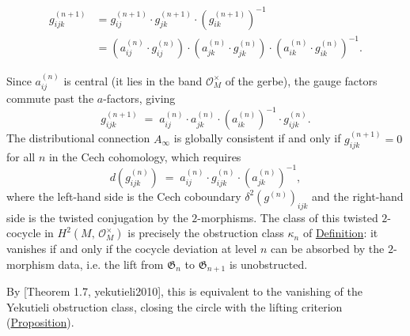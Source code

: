 \begin{proposition}
\begin{align*}
  g_{ijk}^{(n+1)}
  &= g_{ij}^{(n+1)} \cdot g_{jk}^{(n+1)} \cdot (g_{ik}^{(n+1)})^{-1} \\
  &= (a_{ij}^{(n)} \cdot g_{ij}^{(n)}) \cdot (a_{jk}^{(n)} \cdot g_{jk}^{(n)})
     \cdot (a_{ik}^{(n)} \cdot g_{ik}^{(n)})^{-1}.
\end{align*}

Since $a_{ij}^{(n)}$ is central (it lies in the band
$\mathcal{O}_M^{\times}$ of the gerbe), the gauge factors commute past
the $a$-factors, giving
\[
g_{ijk}^{(n+1)}
  \;=\;
  a_{ij}^{(n)} \cdot a_{jk}^{(n)} \cdot (a_{ik}^{(n)})^{-1}
  \cdot g_{ijk}^{(n)}.
\]
The distributional connection $A_\infty$ is globally consistent if and
only if $g_{ijk}^{(n+1)} = 0$ for all $n$ in the Cech cohomology,
which requires
\[
d(g_{ijk}^{(n)})
  \;=\;
  a_{ij}^{(n)} \cdot g_{ijk}^{(n)} \cdot (a_{jk}^{(n)})^{-1},
\]
where the left-hand side is the Cech coboundary
$\delta^2(g^{(n)})_{ijk}$ and the right-hand side is the twisted
conjugation by the $2$-morphisms.  The class of this twisted $2$-cocycle
in $H^2(M,\, \mathcal{O}_M^{\times})$ is precisely the obstruction
class $\kappa_n$ of
\hyperref[def:quantum-characteristic-classes]{Definition}: it vanishes if and
only if the cocycle deviation at level $n$ can be absorbed by the
$2$-morphism data, i.e. the lift from $\mathfrak{G}_n$ to
$\mathfrak{G}_{n+1}$ is unobstructed.

By [Theorem 1.7, yekutieli2010], this is equivalent to the
vanishing of the Yekutieli obstruction class, closing the circle with
the lifting criterion (\hyperref[prop:yekutieli-lifting]{Proposition}).
\end{proposition}
